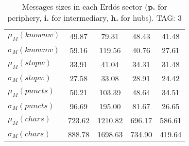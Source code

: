\begin{table}[h!]
\begin{center}
\begin{tabular}{| l || c | c | c | c |}
$\mu_M(knownw)$ & 49.87  & 79.31  & 48.43  & 41.48 \\
$\sigma_M(knownw)$ & 59.16  & 119.56  & 40.76  & 27.61 \\\hline
$\mu_M(stopw)$ & 33.91  & 41.04  & 34.31  & 31.48 \\
$\sigma_M(stopw)$ & 27.58  & 33.08  & 28.91  & 24.42 \\\hline
$\mu_M(puncts)$ & 50.21  & 103.39  & 48.64  & 34.51 \\
$\sigma_M(puncts)$ & 96.69  & 195.00  & 81.67  & 26.65 \\\hline
$\mu_M(chars)$ & 723.62  & 1210.82  & 696.17  & 586.61 \\
$\sigma_M(chars)$ & 888.78  & 1698.63  & 734.90  & 419.64 \\\hline
\end{tabular}
\caption{Messages sizes in each Erd\"os sector ({{\bf p.}} for periphery, {{\bf i.}} for intermediary, {{\bf h.}} for hubs). TAG: 3}
\end{center}
\end{table}